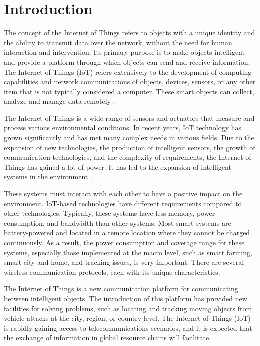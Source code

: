 \chapter{Introduction}
The concept of the Internet of Things refers to objects with a unique identity and the ability to transmit data over the network, without the need for human interaction and intervention. Its primary purpose is to make objects intelligent and provide a platform through which objects can send and receive information. The Internet of Things (IoT) refers extensively to the development of computing capabilities and network communications of objects, devices, sensors, or any other item that is not typically considered a computer.
These smart objects can collect, analyze and manage data remotely \cite{1}.

The Internet of Things is a wide range of sensors and actuators that measure and process various environmental conditions. In recent years, IoT technology has grown significantly and has met many complex needs in various fields. Due to the expansion of new technologies, the production of intelligent sensors, the growth of communication technologies, and the complexity of requirements, the Internet of Things has gained a lot of power. It has led to the expansion of intelligent systems in the environment \cite{2}.

These systems must interact with each other to have a positive impact on the environment. IoT-based technologies have different requirements compared to other technologies. Typically, these systems have less memory, power consumption, and bandwidth than other systems. Most smart systems are battery-powered and located in a remote location where they cannot be charged continuously. As a result, the power consumption and coverage range for these systems, especially those implemented at the macro level, such as smart farming, smart city and home, and tracking issues, is very important. There are several wireless communication protocols, each with its unique characteristics.

The Internet of Things is a new communication platform for communicating between intelligent objects. The introduction of this platform has provided new facilities for solving problems, such as locating and tracking moving objects from vehicle attacks at the city, region, or country level. The Internet of Things (IoT) is rapidly gaining access to telecommunications scenarios, and it is expected that the exchange of information in global resource chains will facilitate.

